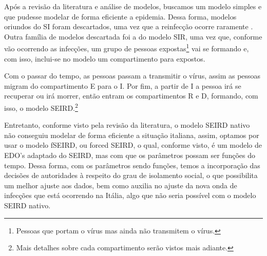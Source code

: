 \documentclass{article}
\begin{document}
% 
Após a revisão da literatura e análise de modelos, buscamos um modelo simples e que pudesse modelar de forma eficiente a epidemia. Dessa forma, modelos oriundos do SI foram descartados, uma vez que a reinfecção ocorre raramente \cite{again}. Outra família de modelos descartada foi a do modelo SIR, uma vez que, conforme vão ocorrendo as infecções, um grupo de pessoas expostas\footnote{Pessoas que portam o vírus mas ainda não transmitem o vírus.} vai se formando e, com isso, inclui-se no modelo um compartimento para expostos.

Com o passar do tempo, as pessoas passam a transmitir o vírus, assim as pessoas migram do compartimento E para o I. Por fim, a partir de I a pessoa irá se recuperar ou irá morrer, então entram os compartimentos R e D, formando, com isso, o modelo SEIRD.\footnote{Mais detalhes sobre cada compartimento serão vistos %
mais adiante.}

Entretanto, conforme visto pela revisão da literatura, o modelo SEIRD nativo não conseguiu modelar de forma eficiente a situação italiana, assim, optamos por usar o modelo fSEIRD, ou forced SEIRD, o qual, conforme visto, é um modelo de EDO's adaptado do SEIRD, mas com que os parâmetros possam ser funções do tempo. Dessa forma, com os parâmetros sendo funções, temos a incorporação das decisões de autoridades à respeito do grau de isolamento social, o que possibilita um melhor ajuste aos dados, bem como auxilia no ajuste da nova onda de infecções que está ocorrendo na Itália, algo que não seria possível com o modelo SEIRD nativo.
\end{document}
